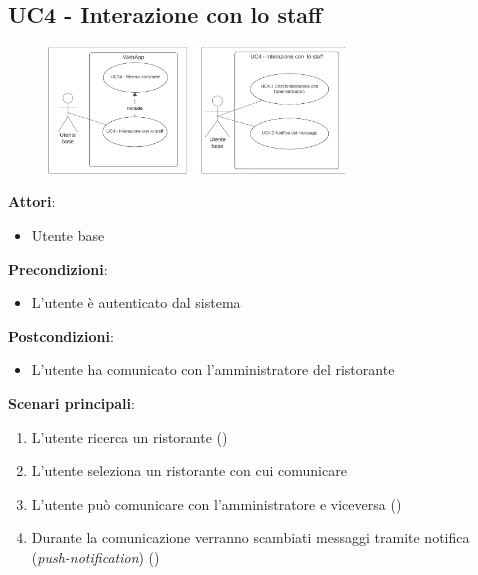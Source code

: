 \subsection{UC4 - Interazione con lo staff}\label{usecase:4}
\begin{figure}[H]
  \centering
  \includegraphics[width=0.7\textwidth]{ucd/UCD4.png}
\end{figure}
\textbf{Attori}:
\begin{itemize}
    \item Utente base
\end{itemize}
\textbf{Precondizioni}:
\begin{itemize}
    \item L'utente è autenticato dal sistema
\end{itemize}
\textbf{Postcondizioni}:
\begin{itemize}
    \item L'utente ha comunicato con l'amministratore del ristorante
\end{itemize}
\textbf{Scenari principali}:
\begin{enumerate}
    \item L'utente ricerca un ristorante ()
    \item L'utente seleziona un ristorante con cui comunicare
    \item L'utente può comunicare con l'amministratore e viceversa ()
    \item Durante la comunicazione verranno scambiati messaggi tramite notifica (\textit{push-notification}) () 
\end{enumerate}